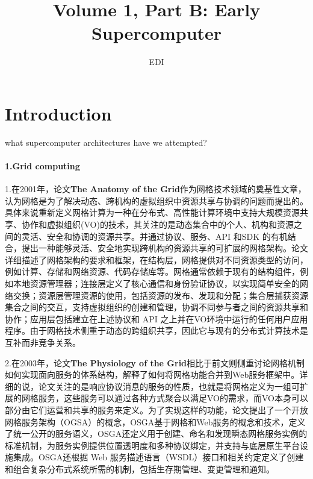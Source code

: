 \documentclass[a4paper,twoside]{scrbook}
\begin{document}
\title{Volume 1, Part B: Early Supercomputer}
\author{EDI}
\frontmatter
\maketitle
\tableofcontents
\mainmatter

\chapter{Introduction}

what supercomputer architectures have we attempted?

\subsubsection{1.Grid computing}
1.在2001年，论文\textbf{The Anatomy of the Grid}作为网格技术领域的奠基性文章，认为网格是为了解决动态、跨机构的虚拟组织中资源共享与协调的问题而提出的。具体来说重新定义网格计算为一种在分布式、高性能计算环境中支持大规模资源共享、协作和虚拟组织(VO)的技术，其关注的是动态集合中的个人、机构和资源之间的灵活、安全和协调的资源共享。并通过协议、服务、API 和SDK 的有机结合，提出一种能够灵活、安全地实现跨机构的资源共享的可扩展的网格架构。论文详细描述了网格架构的要求和框架，在结构层，网格提供对不同资源类型的访问，例如计算、存储和网络资源、代码存储库等。网格通常依赖于现有的结构组件，例如本地资源管理器；连接层定义了核心通信和身份验证协议，以实现简单安全的网络交换；资源层管理资源的使用，包括资源的发布、发现和分配；集合层捕获资源集合之间的交互，支持虚拟组织的创建和管理，协调不同参与者之间的资源共享和协作；应用层包括建立在上述协议和 API 之上并在VO环境中运行的任何用户应用程序。由于网格技术侧重于动态的跨组织共享，因此它与现有的分布式计算技术是互补而非竞争关系。

2.在2003年，论文\textbf{The Physiology of the Grid}相比于前文则侧重讨论网格机制如何实现面向服务的体系结构，解释了如何将网格功能合并到Web服务框架中。详细的说，论文关注的是响应协议消息的服务的性质，也就是将网格定义为一组可扩展的网格服务，这些服务可以通过各种方式聚合以满足VO的需求，而VO本身可以部分由它们运营和共享的服务来定义。为了实现这样的功能，论文提出了一个开放网格服务架构（OGSA）的概念，OSGA基于网格和Web服务的概念和技术，定义了统一公开的服务语义，OSGA还定义用于创建、命名和发现瞬态网格服务实例的标准机制，为服务实例提供位置透明度和多种协议绑定，并支持与底层原生平台设施集成。OSGA还根据 Web 服务描述语言（WSDL）接口和相关约定定义了创建和组合复杂分布式系统所需的机制，包括生存期管理、变更管理和通知。
\end{document}
